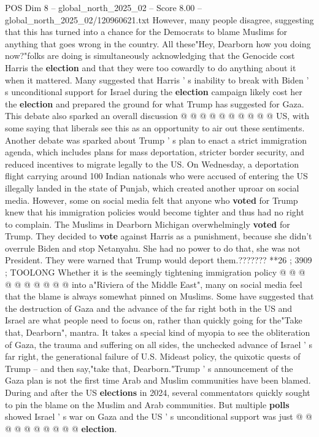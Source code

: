 \begin{textsample}{POS Dim 8 – global\_north\_2025\_02 – Score 8.00 – global\_north\_2025\_02/120960621.txt}
However, many people disagree, suggesting that this has turned into a chance for the Democrats to blame Muslims for anything that goes wrong in the country.
All these"Hey, Dearborn how you doing now?"folks are doing is simultaneously acknowledging that the Genocide cost Harris the \textbf{election} and that they were too cowardly to do anything about it when it mattered.
Many suggested that Harris ' s inability to break with Biden ' s unconditional support for Israel during the \textbf{election} campaign likely cost her the \textbf{election} and prepared the ground for what Trump has suggested for Gaza.
This debate also sparked an overall discussion @ @ @ @ @ @ @ @ @ @ US, with some saying that liberals see this as an opportunity to air out these sentiments.
Another debate was sparked about Trump ' s plan to enact a strict immigration agenda, which includes plans for mass deportation, stricter border security, and reduced incentives to migrate legally to the US.
On Wednesday, a deportation flight carrying around 100 Indian nationals who were accused of entering the US illegally landed in the state of Punjab, which created another uproar on social media.
However, some on social media felt that anyone who \textbf{voted} for Trump knew that his immigration policies would become tighter and thus had no right to complain.
The Muslims in Dearborn Michigan overwhelmingly \textbf{voted} for Trump.
They decided to \textbf{vote} against Harris as a punishment, because she didn't overrule Biden and stop Netanyahu.
She had no power to do that, she was not President.
They were warned that Trump would deport them.??????? **26 ; 3909 ; TOOLONG Whether it is the seemingly tightening immigration policy @ @ @ @ @ @ @ @ @ @ into a"Riviera of the Middle East", many on social media feel that the blame is always somewhat pinned on Muslims.
Some have suggested that the destruction of Gaza and the advance of the far right both in the US and Israel are what people need to focus on, rather than quickly going for the"Take that, Dearborn", mantra.
It takes a special kind of myopia to see the obliteration of Gaza, the trauma and suffering on all sides, the unchecked advance of Israel ' s far right, the generational failure of U.S.
Mideast policy, the quixotic quests of Trump -- and then say,"take that, Dearborn."Trump ' s announcement of the Gaza plan is not the first time Arab and Muslim communities have been blamed.
During and after the US \textbf{elections} in 2024, several commentators quickly sought to pin the blame on the Muslim and Arab communities.
But multiple \textbf{polls} showed Israel ' s war on Gaza and the US ' s unconditional support was just @ @ @ @ @ @ @ @ @ @ \textbf{election}.

\end{textsample}
